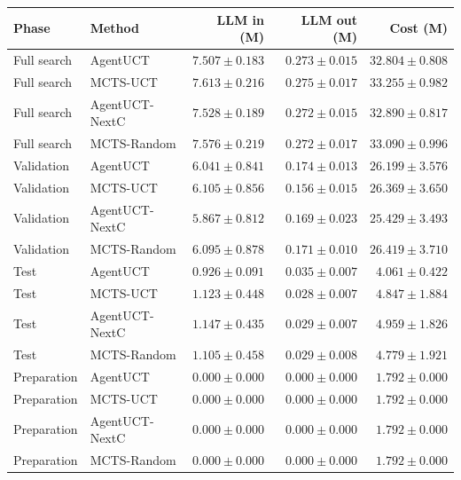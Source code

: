 \begin{tabular}{@{}llrrr@{}}
\toprule
Phase & Method & LLM in (M) & LLM out (M) & Cost (M) \\
\midrule
Full search & AgentUCT & $7.507 \pm 0.183$ & $0.273 \pm 0.015$ & $32.804 \pm 0.808$ \\
Full search & MCTS-UCT & $7.613 \pm 0.216$ & $0.275 \pm 0.017$ & $33.255 \pm 0.982$ \\
Full search & AgentUCT-NextC & $7.528 \pm 0.189$ & $0.272 \pm 0.015$ & $32.890 \pm 0.817$ \\
Full search & MCTS-Random & $7.576 \pm 0.219$ & $0.272 \pm 0.017$ & $33.090 \pm 0.996$ \\
Validation & AgentUCT & $6.041 \pm 0.841$ & $0.174 \pm 0.013$ & $26.199 \pm 3.576$ \\
Validation & MCTS-UCT & $6.105 \pm 0.856$ & $0.156 \pm 0.015$ & $26.369 \pm 3.650$ \\
Validation & AgentUCT-NextC & $5.867 \pm 0.812$ & $0.169 \pm 0.023$ & $25.429 \pm 3.493$ \\
Validation & MCTS-Random & $6.095 \pm 0.878$ & $0.171 \pm 0.010$ & $26.419 \pm 3.710$ \\
Test & AgentUCT & $0.926 \pm 0.091$ & $0.035 \pm 0.007$ & $4.061 \pm 0.422$ \\
Test & MCTS-UCT & $1.123 \pm 0.448$ & $0.028 \pm 0.007$ & $4.847 \pm 1.884$ \\
Test & AgentUCT-NextC & $1.147 \pm 0.435$ & $0.029 \pm 0.007$ & $4.959 \pm 1.826$ \\
Test & MCTS-Random & $1.105 \pm 0.458$ & $0.029 \pm 0.008$ & $4.779 \pm 1.921$ \\
Preparation & AgentUCT & $0.000 \pm 0.000$ & $0.000 \pm 0.000$ & $1.792 \pm 0.000$ \\
Preparation & MCTS-UCT & $0.000 \pm 0.000$ & $0.000 \pm 0.000$ & $1.792 \pm 0.000$ \\
Preparation & AgentUCT-NextC & $0.000 \pm 0.000$ & $0.000 \pm 0.000$ & $1.792 \pm 0.000$ \\
Preparation & MCTS-Random & $0.000 \pm 0.000$ & $0.000 \pm 0.000$ & $1.792 \pm 0.000$ \\
\bottomrule
\end{tabular}
